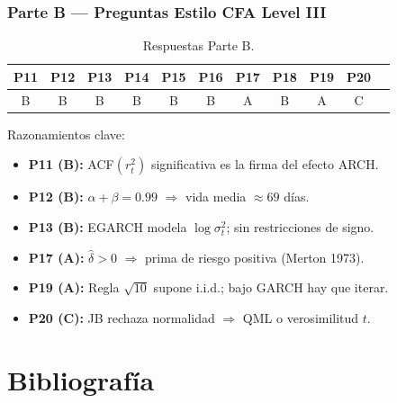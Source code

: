 \documentclass[12pt,letterpaper]{article}
\begin{document}
\section{Parte B --- Preguntas Estilo CFA Level III}

\begin{table}[h!]
\centering
\begin{tabular}{@{}ccccccccccc@{}}
\toprule
P11 & P12 & P13 & P14 & P15 & P16 & P17 & P18 & P19 & P20 \\
\midrule
B & B & B & B & B & B & A & B & A & C \\
\bottomrule
\end{tabular}
\caption{Respuestas Parte B.}
\end{table}

Razonamientos clave:
\begin{itemize}
  \item \textbf{P11 (B):} ACF$(r_t^2)$ significativa es la firma del efecto ARCH.
  \item \textbf{P12 (B):} $\alpha{+}\beta=0.99$ $\Rightarrow$ vida media $\approx69$ d\'ias.
  \item \textbf{P13 (B):} EGARCH modela $\log\sigma_t^2$; sin restricciones de signo.
  \item \textbf{P17 (A):} $\hat{\delta}>0$ $\Rightarrow$ prima de riesgo positiva (Merton 1973).
  \item \textbf{P19 (A):} Regla $\sqrt{10}$ supone i.i.d.; bajo GARCH hay que iterar.
  \item \textbf{P20 (C):} JB rechaza normalidad $\Rightarrow$ QML o verosimilitud $t$.
\end{itemize}

\part*{Bibliograf\'ia}
\end{document}
